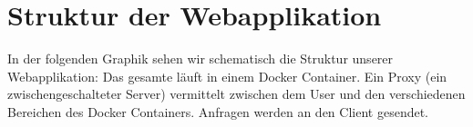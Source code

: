 \section{Struktur der Webapplikation}

In der folgenden Graphik sehen wir schematisch die Struktur unserer Webapplikation: Das gesamte läuft in einem Docker Container. Ein Proxy (ein zwischengeschalteter Server) vermittelt zwischen dem User und den verschiedenen Bereichen des Docker Containers. Anfragen werden an den Client gesendet.






